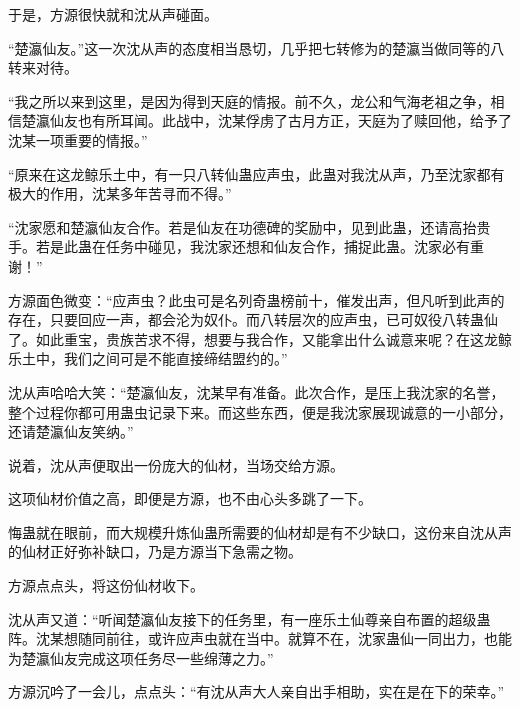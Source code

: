 \begin{this_body}
于是，方源很快就和沈从声碰面。

“楚瀛仙友。”这一次沈从声的态度相当恳切，几乎把七转修为的楚瀛当做同等的八转来对待。

“我之所以来到这里，是因为得到天庭的情报。前不久，龙公和气海老祖之争，相信楚瀛仙友也有所耳闻。此战中，沈某俘虏了古月方正，天庭为了赎回他，给予了沈某一项重要的情报。”

“原来在这龙鲸乐土中，有一只八转仙蛊应声虫，此蛊对我沈从声，乃至沈家都有极大的作用，沈某多年苦寻而不得。”

“沈家愿和楚瀛仙友合作。若是仙友在功德碑的奖励中，见到此蛊，还请高抬贵手。若是此蛊在任务中碰见，我沈家还想和仙友合作，捕捉此蛊。沈家必有重谢！”

方源面色微变：“应声虫？此虫可是名列奇蛊榜前十，催发出声，但凡听到此声的存在，只要回应一声，都会沦为奴仆。而八转层次的应声虫，已可奴役八转蛊仙了。如此重宝，贵族苦求不得，想要与我合作，又能拿出什么诚意来呢？在这龙鲸乐土中，我们之间可是不能直接缔结盟约的。”

沈从声哈哈大笑：“楚瀛仙友，沈某早有准备。此次合作，是压上我沈家的名誉，整个过程你都可用蛊虫记录下来。而这些东西，便是我沈家展现诚意的一小部分，还请楚瀛仙友笑纳。”

说着，沈从声便取出一份庞大的仙材，当场交给方源。

这项仙材价值之高，即便是方源，也不由心头多跳了一下。

悔蛊就在眼前，而大规模升炼仙蛊所需要的仙材却是有不少缺口，这份来自沈从声的仙材正好弥补缺口，乃是方源当下急需之物。

方源点点头，将这份仙材收下。

沈从声又道：“听闻楚瀛仙友接下的任务里，有一座乐土仙尊亲自布置的超级蛊阵。沈某想随同前往，或许应声虫就在当中。就算不在，沈家蛊仙一同出力，也能为楚瀛仙友完成这项任务尽一些绵薄之力。”

方源沉吟了一会儿，点点头：“有沈从声大人亲自出手相助，实在是在下的荣幸。”

\end{this_body}

